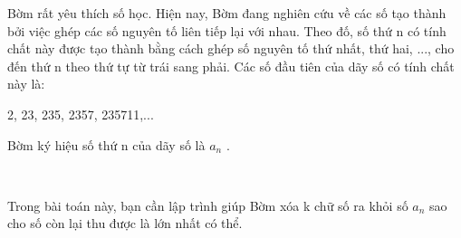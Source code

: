 Bờm rất yêu thích số học. Hiện nay, Bờm đang nghiên cứu về các số tạo thành bởi việc ghép các số nguyên tố liên tiếp lại với nhau. Theo đố, số thứ n có tính chất này được tạo thành bằng cách ghép số nguyên tố thứ nhất, thứ hai, ..., cho đến thứ n theo thứ tự từ trái sang phải. Các số đầu tiên của dãy số có tính chất này là:

2, 23, 235, 2357, 235711,...

Bờm ký hiệu số thứ n của dãy số là $a_{n}$ .

 

Trong bài toán này, bạn cần lập trình giúp Bờm xóa k chữ số ra khỏi số $a_{n}$ sao cho số còn lại thu được là lớn nhất có thể.